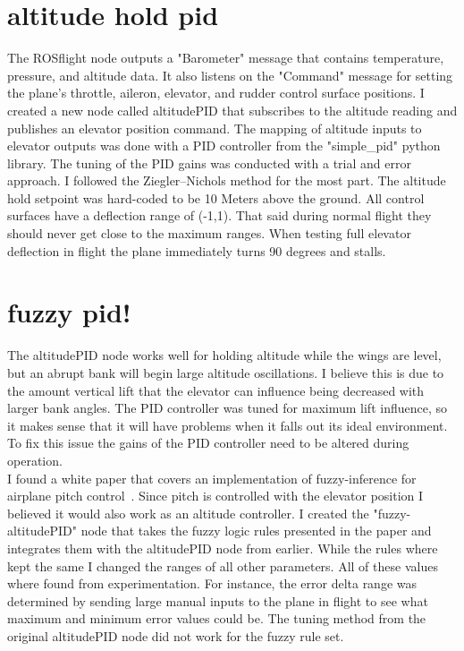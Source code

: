 \documentclass[11pt]{scrartcl} %
\begin{document}
\section{altitude hold pid}
The ROSflight node outputs a "Barometer" message that contains temperature, pressure, and altitude data. It also listens on the "Command" message for setting the plane's throttle, aileron, elevator, and rudder control surface positions. I created a new node called altitudePID that subscribes to the altitude reading and publishes an elevator position command. The mapping of altitude inputs to elevator outputs was done with a PID controller from the "simple\_pid" python library. The tuning of the PID gains was conducted with a trial and error approach. I followed the Ziegler–Nichols method for the most part. The altitude hold setpoint was hard-coded to be 10 Meters above the ground. All control surfaces have a deflection range of (-1,1). That said during normal flight they should never get close to the maximum ranges. When testing full elevator deflection in flight the plane immediately turns 90 degrees and stalls.

\section{fuzzy pid!}
The altitudePID node works well for holding altitude while the wings are level, but an abrupt bank will begin large altitude oscillations. I believe this is due to the amount vertical lift that the elevator can influence being decreased with larger bank angles. The PID controller was tuned for maximum lift influence, so it makes sense that it will have problems when it falls out its ideal environment. To fix this issue the gains of the PID controller need to be altered during operation.  
\\

I found a white paper that covers an implementation of fuzzy-inference for airplane pitch control~\cite{fuzzy}. Since pitch is controlled with the elevator position I believed it would also work as an altitude controller. I created the "fuzzy-altitudePID" node that takes the fuzzy logic rules presented in the paper and integrates them with the altitudePID node from earlier. While the rules where kept the same I changed the ranges of all other parameters. All of these values where found from experimentation. For instance, the error delta range was determined by sending large manual inputs to the plane in flight to see what maximum and minimum error values could be. The tuning method from the original altitudePID node did not work for the fuzzy rule set. 
\end{document}
